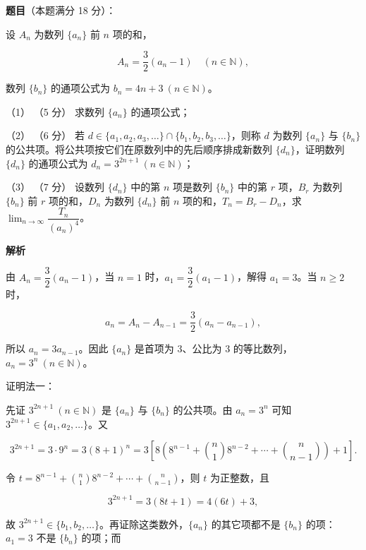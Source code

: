 \begin{answer}

\textbf{题目}（本题满分 18 分）：

设 $A_n$ 为数列 $\{a_n\}$ 前 $n$ 项的和，

\nopagebreak[4]
\[
A_n=\dfrac32(a_n-1)\quad(n\in\mathbb N),
\]

数列 $\{b_n\}$ 的通项公式为 $b_n=4n+3\ (n\in\mathbb N)$。

（1） （5 分） 求数列 $\{a_n\}$ 的通项公式；

（2） （6 分） 若 $d\in\{a_1,a_2,a_3,\ldots\}\cap\{b_1,b_2,b_3,\ldots\}$，则称 $d$ 为数列 $\{a_n\}$ 与 $\{b_n\}$ 的公共项。将公共项按它们在原数列中的先后顺序排成新数列 $\{d_n\}$，证明数列 $\{d_n\}$ 的通项公式为 $d_n=3^{2n+1}\ (n\in\mathbb N)$；

（3） （7 分） 设数列 $\{d_n\}$ 中的第 $n$ 项是数列 $\{b_n\}$ 中的第 $r$ 项，$B_r$ 为数列 $\{b_n\}$ 前 $r$ 项的和，$D_n$ 为数列 $\{d_n\}$ 前 $n$ 项的和，$T_n=B_r-D_n$，求 $\displaystyle\lim_{n\to\infty}\dfrac{T_n}{(a_n)^4}$。

\textbf{解析}


由 $A_n=\dfrac32(a_n-1)$，当 $n=1$ 时，$a_1=\dfrac32(a_1-1)$，解得 $a_1=3$。当 $n\ge2$ 时，

\nopagebreak[4]
\[
a_n=A_n-A_{n-1}=\dfrac32(a_n-a_{n-1}),
\]

所以 $a_n=3a_{n-1}$。因此 $\{a_n\}$ 是首项为 $3$、公比为 $3$ 的等比数列，$a_n=3^n\ (n\in\mathbb N)$。


证明法一：

先证 $3^{2n+1}\ (n\in\mathbb N)$ 是 $\{a_n\}$ 与 $\{b_n\}$ 的公共项。由 $a_n=3^n$ 可知 $3^{2n+1}\in\{a_1,a_2,\ldots\}$。又

\nopagebreak[4]
\[
3^{2n+1}=3\cdot9^n=3(8+1)^n
=3\left[8\left(8^{n-1}+\binom n1 8^{n-2}+\cdots+\binom n{n-1}\right)+1\right].
\]

令 $t=8^{n-1}+\binom n1 8^{n-2}+\cdots+\binom n{n-1}$，则 $t$ 为正整数，且

\nopagebreak[4]
\[
3^{2n+1}=3(8t+1)=4(6t)+3,
\]

故 $3^{2n+1}\in\{b_1,b_2,\ldots\}$。再证除这类数外，$\{a_n\}$ 的其它项都不是 $\{b_n\}$ 的项：$a_1=3$ 不是 $\{b_n\}$ 的项；而


\end{answer}

